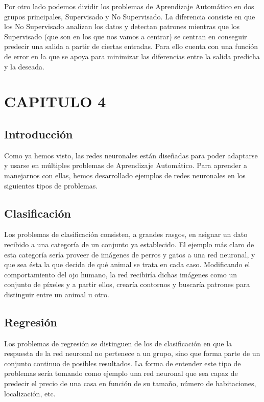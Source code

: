 Por otro lado podemos dividir los problemas de Aprendizaje Automático en dos grupos principales, Supervisado y No Supervisado. La diferencia consiste en que los No Supervisado analizan los datos y detectan patrones mientras que los Supervisado (que son en los que nos vamos a centrar) se centran en conseguir predecir una salida a partir de ciertas entradas. Para ello cuenta con una función de error en la que se apoya para minimizar las diferencias entre la salida predicha y la deseada.

\section{CAPITULO 4}
\subsection{Introducción}
Como ya hemos visto, las redes neuronales están diseñadas para poder adaptarse y usarse en múltiples problemas de Aprendizaje Automático. Para aprender a manejarnos con ellas, hemos desarrollado ejemplos de redes neuronales en los siguientes tipos de problemas.


\subsection{Clasificación}
Los problemas de clasificación consisten, a grandes rasgos, en asignar un dato recibido a una categoría de un conjunto ya establecido. El ejemplo más claro de esta categoría sería proveer de imágenes de perros y gatos a una red neuronal, y que sea ésta la que decida de qué animal se trata en cada caso. Modificando el comportamiento del ojo humano, la red recibiría dichas imágenes como un conjunto de píxeles y a partir ellos, crearía contornos y buscaría patrones para distinguir entre un animal u otro. \\

\subsection{Regresión}
Los problemas de regresión se distinguen de los de clasificación en que la respuesta de la red neuronal no pertenece a un grupo, sino que forma parte de un conjunto continuo de posibles resultados. La forma de entender este tipo de problemas sería tomando como ejemplo una red neuronal que sea capaz de predecir el precio de una casa en función de su tamaño, número de habitaciones, localización, etc. \\

